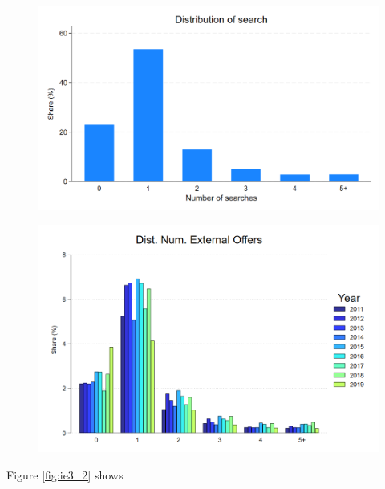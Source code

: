 \documentclass[12pt]{article}
\begin{document}
\begin{figure}[H]
\caption{}
\label{fig:ie3_0}
\centering{}%
\includegraphics[scale=0.27]{../figures/IE3_dist_external_offers.png}
\end{figure}


\begin{figure}[H]
\caption{}
\label{fig:ie3_1}
\centering{}%
\includegraphics[scale=0.27]{../figures/IE3_dist_external_offers_byyear.png}
\end{figure}


Figure \ref{fig:ie3_2} shows 
\end{document}
